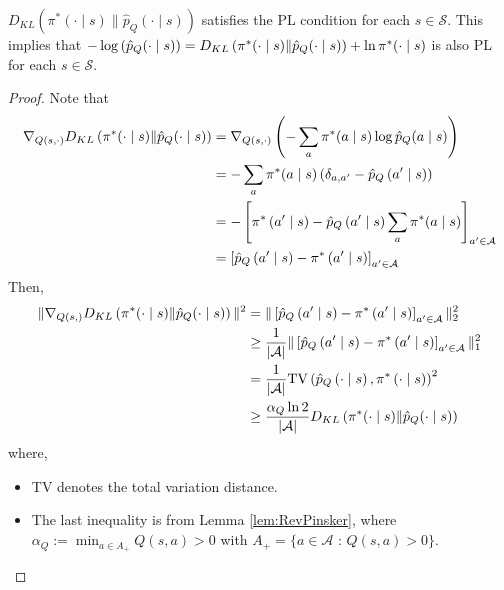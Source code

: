 \begin{lem}\label{lem:KLPL}
$D_{K L}\left(\pi^*(\cdot \mid s) \| \hat{p}_Q(\cdot \mid s)\right)$ satisfies the PL condition for each $s\in\mathcal{S}$. This implies that $-\log \left(\hat{p}_Q(\cdot \mid s)\right) =D_{K L}\left(\pi^*(\cdot \mid s) \| \hat{p}_Q(\cdot \mid s)\right)+\ln \pi^*(\cdot\mid s)\notag$ is also PL for each $s\in \mathcal{S}$.
\end{lem}
\begin{proof}
Note that
\begin{align}
     \nabla_{Q(s, \cdot)}D_{K L}\left(\pi^*(\cdot \mid s) \| \hat{p}_Q(\cdot \mid s)\right)&= \nabla_{Q(s, \cdot)}\left(-\sum_a \pi^*(a \mid s) \log \hat{p}_Q(a \mid s)\right) \notag
     \\
     &=-\sum_a \pi^*(a \mid s)\left(\delta_{a, a^{\prime}}-\hat{p}_Q\left(a^{\prime} \mid s\right)\right)\notag
     \\
     &=-\left[\pi^*\left(a^{\prime} \mid s\right)-\hat{p}_Q\left(a^{\prime} \mid s\right) \sum_a \pi^*(a \mid s)\right]_{a^{\prime} \in \mathcal{A}}\notag
     \\
     &=\left[\hat{p}_Q\left(a^{\prime} \mid s\right)-\pi^*\left(a^{\prime} \mid s\right)\right]_{a^{\prime} \in \mathcal{A}} \notag
\end{align}
Then, 
\begin{align}
    \|\nabla_{Q(s,)} D_{K L}\left(\pi^*(\cdot \mid s) \| \hat{p}_Q(\cdot \mid s)\right)\|^2 & = \|\left[\hat{p}_Q\left(a^{\prime} \mid s\right)-\pi^*\left(a^{\prime} \mid s\right)\right]_{a^{\prime} \in \mathcal{A}}\|_2^2\notag
    \\
    & \ge \frac{1}{|\mathcal{A}|} \|\left[\hat{p}_Q\left(a^{\prime} \mid s\right)-\pi^*\left(a^{\prime} \mid s\right)\right]_{a^{\prime} \in \mathcal{A}}\|_1^2 \notag
    \\
    & = \frac{1}{|\mathcal{A}|} \text{TV}\left(\hat{p}_Q\left(\cdot \mid s\right),\pi^*\left(\cdot \mid s\right)\right)^2 \notag
    \\
    &\ge \frac{\alpha_Q \ln 2}{|\mathcal{A}|} D_{K L}\left(\pi^*(\cdot \mid s) \| \hat{p}_Q(\cdot \mid s)\right) \notag
\end{align}
where,
\begin{itemize}
    \item TV denotes the total variation distance.
    \item The last inequality is from Lemma \ref{lem:RevPinsker}, where $\alpha_Q:=\min _{a \in A_{+}} Q(s,a)>0$ with $A_{+}=\{a\in\mathcal{A}$ : $Q(s,a)>0\}$.
\end{itemize}
\end{proof}

